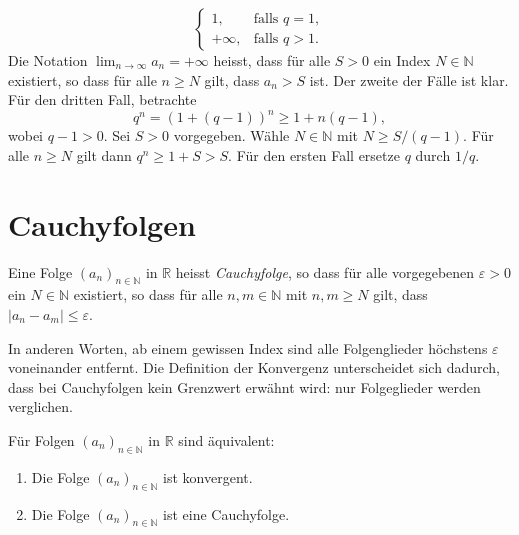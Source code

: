 \documentclass[../main.tex]{subfiles}
\begin{document}
\begin{examples}
\begin{enumerate}[(1)]
\[\begin{cases}
		    1, & \text{falls } q = 1, \\
		    +\infty, & \text{falls } q > 1.
	    \end{cases}
	  \]
	Die Notation
	\(
	  \lim_{n \to \infty} a_n = + \infty
	\)
	heisst, dass für alle $S > 0$ ein Index $N \in \mathbb{N}$
	existiert, so dass für alle $n \geq N$ gilt, dass
	$a_n > S$ ist.
	Der zweite der Fälle ist klar. Für den dritten Fall, 
	betrachte
	\[
		q^n = {\left( 1 + (q-1) \right)}^n \geq 1 + n(q-1),
	\]
	wobei $q-1 > 0$. 
	Sei $S > 0$ vorgegeben. Wähle $N \in \mathbb{N}$ mit
	\(
  N \geq {S}/{(q-1)}.
	\)
	Für alle $n \geq N$ gilt dann $q^n \geq 1 + S > S$.
	Für den ersten Fall ersetze $q$ durch $1/q$.
\end{enumerate}
\end{examples}

\section{Cauchyfolgen}
\begin{definition}
Eine Folge 
${\left( a_n \right)}_{n \in \mathbb{N}}$ in $\mathbb{R}$ 
heisst \emph{Cauchyfolge}, so dass für alle
vorgegebenen $\varepsilon > 0$ ein $N \in \mathbb{N}$ existiert,
so dass für alle $n, m \in \mathbb{N}$ mit $n,m \geq N$ gilt,
dass $|a_n - a_m| \leq \varepsilon$.
\end{definition}

In anderen Worten, ab einem gewissen Index sind alle
Folgenglieder höchstens $\varepsilon$ voneinander 
entfernt. Die Definition der Konvergenz unterscheidet
sich dadurch, dass bei Cauchyfolgen kein Grenzwert
erwähnt wird: nur Folgeglieder werden verglichen.

\begin{theorem}
Für Folgen ${\left( a_n \right)}_{n \in \mathbb{N}}$ in $\mathbb{R}$
  sind äquivalent:
  \begin{enumerate}[\normalfont(i)]
    \item Die Folge ${\left( a_n \right)}_{n \in \mathbb{N}}$
      ist konvergent.
    \item Die Folge ${\left( a_n \right)}_{n \in \mathbb{N}}$
      ist eine Cauchyfolge.
  \end{enumerate}
\end{theorem}
\end{document}
